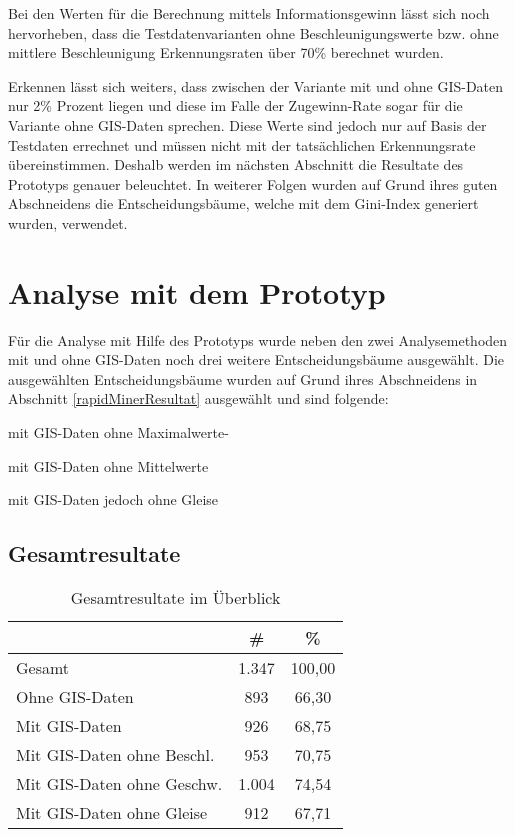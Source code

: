 Bei den Werten für die Berechnung mittels Informationsgewinn lässt sich noch hervorheben, dass die Testdatenvarianten ohne Beschleunigungswerte bzw. ohne mittlere Beschleunigung Erkennungsraten über 70\% berechnet wurden. 

Erkennen lässt sich weiters, dass zwischen der Variante mit und ohne GIS-Daten nur 2\% Prozent liegen und diese im Falle der Zugewinn-Rate sogar für die Variante ohne GIS-Daten sprechen. Diese Werte sind jedoch nur auf Basis der Testdaten errechnet und müssen nicht mit der tatsächlichen Erkennungsrate übereinstimmen. Deshalb werden im nächsten Abschnitt die Resultate des Prototyps genauer beleuchtet. In weiterer Folgen wurden auf Grund ihres guten Abschneidens die Entscheidungsbäume, welche mit dem Gini-Index generiert wurden, verwendet.

\section{Analyse mit dem Prototyp}
Für die Analyse mit Hilfe des Prototyps wurde neben den zwei Analysemethoden mit und ohne GIS-Daten noch drei weitere Entscheidungsbäume ausgewählt. Die ausgewählten Entscheidungsbäume wurden auf Grund ihres Abschneidens in Abschnitt \ref{rapidMinerResultat}  ausgewählt und sind folgende:
\begin{pitemize}
\item mit GIS-Daten ohne Maximalwerte-
\item mit GIS-Daten ohne Mittelwerte
\item mit GIS-Daten jedoch ohne Gleise
\end{pitemize}

\subsection{Gesamtresultate}

\begin{table}[h]
\centering
\begin{tabular}{|l|c|c|}
\hline
 & \# & \% \\ \hline
Gesamt & 1.347 & 100,00 \\ \hline
Ohne GIS-Daten & 893 & 66,30 \\ \hline
Mit GIS-Daten & 926 & 68,75 \\ \hline
Mit GIS-Daten ohne Beschl. & 953 & 70,75 \\ \hline
Mit GIS-Daten ohne Geschw. & 1.004 & 74,54 \\ \hline
Mit GIS-Daten ohne Gleise & 912 & 67,71 \\ \hline
\end{tabular}
\caption{Gesamtresultate im Überblick}
\label{my-label}
\end{table}

